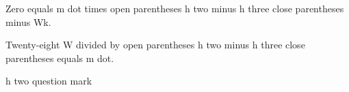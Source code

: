 Zero equals m dot times open parentheses h two minus h three close parentheses minus Wk. 

Twenty-eight W divided by open parentheses h two minus h three close parentheses equals m dot. 

h two question mark